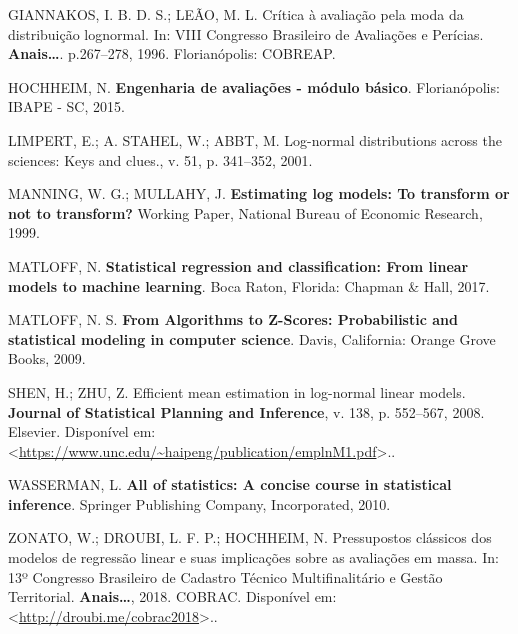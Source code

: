 \documentclass[a4paper, 12pt]{article}
\begin{document}
\hypertarget{ref-giannakos}{}
GIANNAKOS, I. B. D. S.; LEÃO, M. L. Crítica à avaliação pela moda da
distribuição lognormal. In: VIII Congresso Brasileiro de Avaliações e
Perícias. \textbf{Anais\ldots{}}. p.267--278, 1996. Florianópolis:
COBREAP.

\hypertarget{ref-hochheim}{}
HOCHHEIM, N. \textbf{Engenharia de avaliações - módulo básico}.
Florianópolis: IBAPE - SC, 2015.

\hypertarget{ref-limpert}{}
LIMPERT, E.; A. STAHEL, W.; ABBT, M. Log-normal distributions across the
sciences: Keys and clues., v. 51, p. 341--352, 2001.

\hypertarget{ref-NBERt0246}{}
MANNING, W. G.; MULLAHY, J. \textbf{Estimating log models: To transform
or not to transform?} Working Paper, National Bureau of Economic
Research, 1999.

\hypertarget{ref-matloff2017}{}
MATLOFF, N. \textbf{Statistical regression and classification: From
linear models to machine learning}. Boca Raton, Florida: Chapman \&
Hall, 2017.

\hypertarget{ref-matloff2009}{}
MATLOFF, N. S. \textbf{From Algorithms to Z-Scores: Probabilistic and
statistical modeling in computer science}. Davis, California: Orange
Grove Books, 2009.

\hypertarget{ref-shen}{}
SHEN, H.; ZHU, Z. Efficient mean estimation in log-normal linear models.
\textbf{Journal of Statistical Planning and Inference}, v. 138, p.
552--567, 2008. Elsevier. Disponível em:
\textless{}\url{https://www.unc.edu/~haipeng/publication/emplnM1.pdf}\textgreater{}..

\hypertarget{ref-wasserman}{}
WASSERMAN, L. \textbf{All of statistics: A concise course in statistical
inference}. Springer Publishing Company, Incorporated, 2010.

\hypertarget{ref-pressupostos_classicos}{}
ZONATO, W.; DROUBI, L. F. P.; HOCHHEIM, N. Pressupostos clássicos dos
modelos de regressão linear e suas implicações sobre as avaliações em
massa. In: 13º Congresso Brasileiro de Cadastro Técnico Multifinalitário
e Gestão Territorial. \textbf{Anais\ldots{}}, 2018. COBRAC. Disponível
em: \textless{}\url{http://droubi.me/cobrac2018}\textgreater{}..
\end{document}
